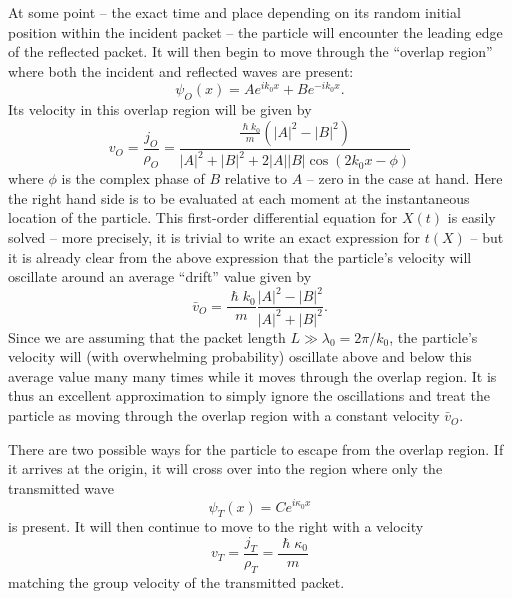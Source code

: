 \documentclass[aps,prc,onecolumn,letterpaper,floatfix,12pt]{revtex4}
\renewcommand{\hbar}{\hslash}
\begin{document}
At some point -- the exact time and place depending on its random
initial position within the incident packet -- the particle will
encounter the leading edge of the reflected packet.  It will then
begin to move through the ``overlap region'' where both the incident
and reflected waves are present:
\begin{equation}
\psi_O(x) = A e^{ik_0x} + B e^{-ik_0x}.
\end{equation}
Its velocity in this overlap region will be given by
\begin{equation}
v_O = \frac{j_O}{\rho_O} = \frac{ \frac{\hbar k_0}{m} \left(
    |A|^2 - |B|^2 \right)}{|A|^2 + |B|^2 + 2 |A|  |B| \cos(2 k_0 x-\phi)}
\label{vO}
\end{equation}
where $\phi$ is the complex phase of $B$ relative to $A$ -- zero in
the case at hand.
Here the right hand side is to be evaluated at each moment at the
instantaneous location of the particle.  This first-order differential
equation for $X(t)$ is easily solved -- more precisely, it is trivial to
write an exact expression for $t(X)$ -- but it is already clear from
the above expression that the particle's velocity will oscillate
around an average ``drift'' value given by
\begin{equation}
\bar{v}_O = \frac{\hbar k_0}{m} \frac{ |A|^2 - |B|^2}{|A|^2 + |B|^2}.
\label{voverlap}
\end{equation}
Since we are assuming that the packet length $L \gg \lambda_0 = 2 \pi
/ k_0$, the particle's velocity will (with overwhelming probability)
oscillate above and below this average value many many times while it
moves through the overlap region.  It is
thus an excellent approximation to simply ignore the oscillations and
treat the particle as moving through the overlap region with a
constant velocity $\bar{v}_O$.  






There are two possible ways for the particle to escape from the
overlap region.  If it arrives at the origin, it will cross
over into the region where only the transmitted wave
\begin{equation}
\psi_T(x) = C e^{i \kappa_0 x}
\end{equation}
is present.  It will then continue to move to the right with a
velocity
\begin{equation}
v_T =\frac{j_T}{\rho_T}= \frac{\hbar \kappa_0}{m}
\end{equation}
matching the group velocity of the transmitted packet.  
\end{document}
